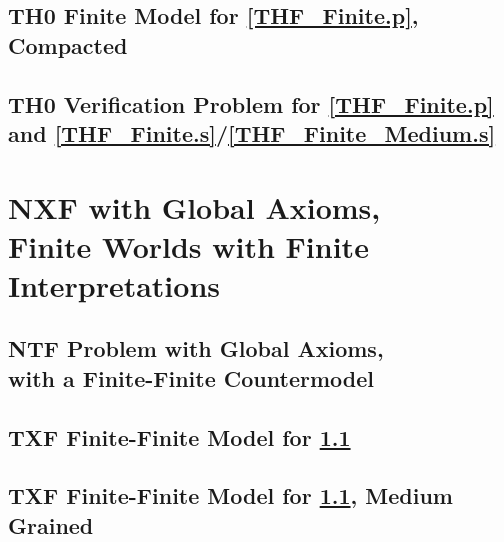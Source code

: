 \documentclass{easychair}
\begin{document}
\newpage
\subsection{TH0 Finite Model for \ref{THF_Finite.p}, Compacted}
\label{THF_Finite_Compact.s}
\begin{small}

\end{small}

\newpage
\subsection{TH0 Verification Problem for \ref{THF_Finite.p} and 
            \ref{THF_Finite.s}/\ref{THF_Finite_Medium.s}}
\label{THF_Finite.s.p}
\begin{small}

\end{small}

\newpage
\section{NXF with Global Axioms, \\
         Finite Worlds with Finite Interpretations}
\label{NXFGlobal}

\subsection{NTF Problem with Global Axioms, \\ with a Finite-Finite Countermodel}
\label{NTF_Finite-Finite-Global.p}
\begin{small}

\end{small}

\newpage
\subsection{TXF Finite-Finite Model for \ref{NTF_Finite-Finite-Global.p}}
\label{NTF_Finite-Finite-Global.s}
\begin{small}

\end{small}

\newpage
\subsection{TXF Finite-Finite Model for \ref{NTF_Finite-Finite-Global.p}, Medium Grained}
\label{NTF_Finite-Finite-Global_Medium.s}
\begin{small}

\end{small}
\end{document}
